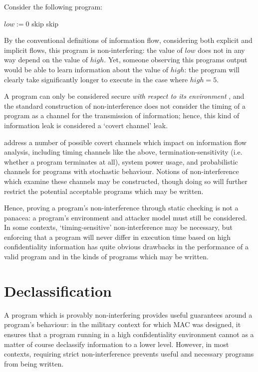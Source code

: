 Consider the following program:

\begin{algorithmic}
	\State $ low := 0 $
			\State skip
		\EndFor
	\Else
		\State skip
	\EndIf
\end{algorithmic}

By the conventional definitions of information flow, considering both explicit and implicit flows, this program is non-interfering: the value of $ low $ does not in any way depend on the value of $ high $. Yet, someone observing this programs output would be able to learn information about the value of $ high $: the program will clearly take significantly longer to execute in the case where $ high = 5 $.

A program can only be considered secure \textit{with respect to its environment} \cite{sabelfeld2003if}, and the standard construction of non-interference does not consider the timing of a program as a channel for the transmission of information; hence, this kind of information leak is considered a `covert channel' leak.

\citeauthor{sabelfeld2003if} \cite{sabelfeld2003if} address a number of possible covert channels which impact on information flow analysis, including timing channels like the above, termination-sensitivity (i.e. whether a program terminates at all), system power usage, and probabilistic channels for programs with stochastic behaviour. Notions of non-interference which examine these channels may be constructed, though doing so will further restrict the potential acceptable programs which may be written.

Hence, proving a program's non-interference through static checking is not a panacea: a program's environment and attacker model must still be considered. In some contexts, `timing-sensitive' non-interference may be necessary, but enforcing that a program will never differ in execution time based on high confidentiality information has quite obvious drawbacks in the performance of a valid program and in the kinds of programs which may be written.

\section{Declassification}

A program which is provably non-interfering provides useful guarantees around a program's behaviour: in the military context for which MAC was designed, it ensures that a program running in a high confidentiality environment cannot as a matter of course declassify information to a lower level. However, in most contexts, requiring strict non-interference prevents useful and necessary programs from being written.


